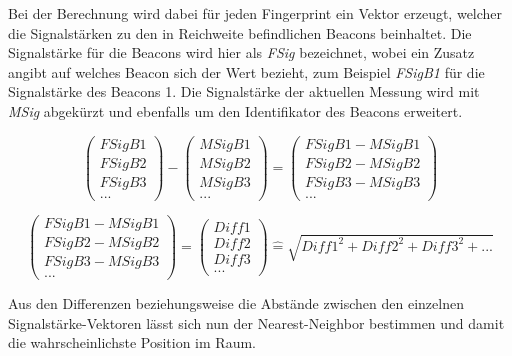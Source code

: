 Bei der Berechnung wird dabei für jeden Fingerprint ein Vektor erzeugt, welcher die Signalstärken zu den in Reichweite befindlichen Beacons beinhaltet.
Die Signalstärke für die Beacons wird hier als \emph{FSig} bezeichnet, wobei ein Zusatz angibt auf welches Beacon sich der Wert bezieht, zum Beispiel \emph{FSigB1} für die Signalstärke des Beacons 1.
Die Signalstärke der aktuellen Messung wird mit \emph{MSig} abgekürzt und ebenfalls um den Identifikator des Beacons erweitert.


\begin{equation}
	\begin{pmatrix}
		FSigB1 \\
		FSigB2 \\
		FSigB3 \\
		...
	\end{pmatrix} -
	\begin{pmatrix}
		MSigB1 \\
		MSigB2 \\
		MSigB3 \\
		...
	\end{pmatrix}
	= 
	\begin{pmatrix}
		FSigB1 - MSigB1 \\
		FSigB2 - MSigB2 \\
		FSigB3 - MSigB3 \\
		...
	\end{pmatrix}
\end{equation}

\begin{equation}
	\begin{pmatrix}
		FSigB1 - MSigB1 \\
		FSigB2 - MSigB2 \\
		FSigB3 - MSigB3 \\
		...
	\end{pmatrix}
	=
	\begin{pmatrix}
		Diff1 \\
		Diff2 \\
		Diff3 \\
		...
	\end{pmatrix}
	\widehat{=}
	\sqrt{Diff1^2 + Diff2^2 + Diff3^2 + ...}
\end{equation}

Aus den Differenzen beziehungsweise die Abstände zwischen den einzelnen Signalstärke-Vektoren lässt sich nun der Nearest-Neighbor bestimmen und damit die wahrscheinlichste Position im Raum.


